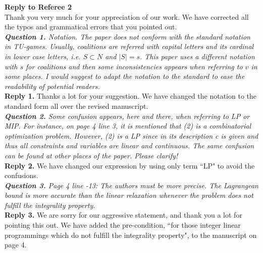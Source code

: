 \documentclass[11pt]{article}
\begin{document}
\noindent \textbf{\large Reply to Referee 2}
\\[3mm]
Thank you very much for your appreciation of our work.
We have corrected all the typos and grammatical errors that you pointed out.
~\\[4mm]
%
%
%
\noindent \textit{\textbf{Question 1.}
Notation. The paper does not conform with the standard notation in TU-games. Usually, coalitions are referred with capital letters and its cardinal in lower case letters, i.e. $S \subset N$ and $|S| = s$. This paper uses a different notation with $s$ for coalitions and then some inconsistencies appears when referring to $v$ in some places. I would suggest to adapt the notation to the standard to ease the readability of potential readers.}
~\\[2mm]
\noindent \textbf{Reply 1.}
Thanks a lot for your suggestion.
We have changed the notation to the standard form all over the revised manuscript.
\\[4mm]
%
%
%
\noindent \textit{\textbf{Question 2.}
Some confusion appears, here and there, when referring to LP or MIP.
For instance, on page 4 line 3, it is mentioned that (2) is a combinatorial optimization problem. However, (2) is a LP since in its description c is
given and thus all constraints and variables are linear and continuous.
The same confusion can be found at other places of the paper. Please clarify!}
\\[2mm]
\noindent \textbf{Reply 2.}
We have changed our expression by using only term ``LP"  to avoid the confusions.
\\[4mm]
%
%
%
\noindent \textit{\textbf{Question 3.}
Page 4 line -13: The authors must be more precise. The Lagrangean
bound is more accurate than the linear relaxation whenever the problem does not fulfill the integrality property.
}
\\[2mm]
\noindent \textbf{Reply 3.}
We are sorry for our aggressive statement, and thank you a lot for pointing this out.
We have added the pre-condition, ``for those integer linear programmings which do not fulfill the integrality property", to the manuscript on page 4.
\end{document}
